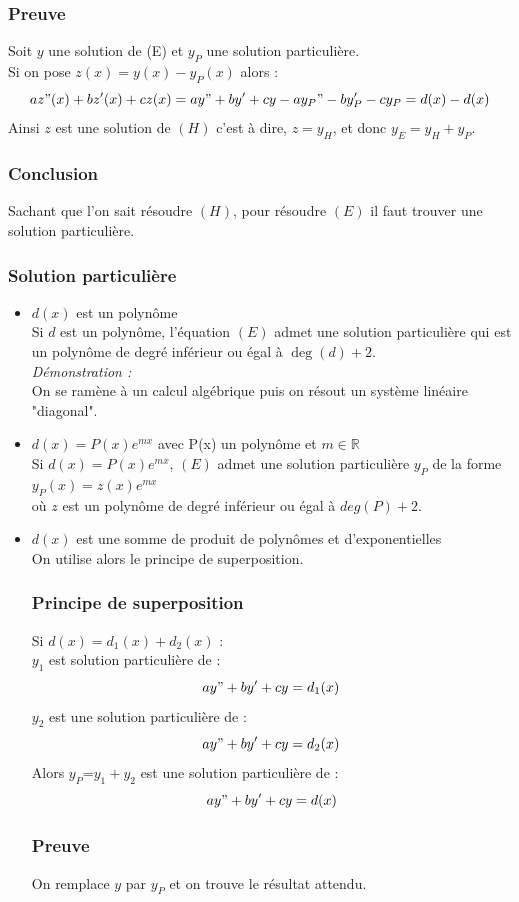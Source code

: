 \documentclass[a4paper,10pt]{book} %
\newcommand{\R}{\mathbb{R}}
\begin{document}
\subsubsection{Preuve}
Soit $y$ une solution de (E) et $y_P$ une solution particulière.\\
Si on pose $z(x)=y(x)-y_P(x)$ alors :
$$az"(x)+bz'(x)+cz(x)=ay"+by'+cy-ay_P"-by_P'-cy_P=d(x)-d(x)$$
Ainsi $z$ est une solution de $(H)$ c'est à dire, $z=y_H$, et donc $y_E=y_H+y_P$.

\subsubsection{Conclusion}
Sachant que l'on sait résoudre $(H)$, pour résoudre $(E)$ il faut trouver une solution particulière.

\subsubsection{Solution particulière}
\begin{itemize}[label=$\bullet$]
\item $d(x)$ est un polynôme\\
Si $d$ est un polynôme, l'équation $(E)$ admet une solution particulière qui est un polynôme de degré inférieur ou égal à $\deg(d)+2$.\\

\textit{Démonstration :}\\
On se ramène à un calcul algébrique puis on résout un système linéaire "diagonal".\\

\item $d(x)=P(x)e^{mx}$ avec P(x) un polynôme et $m\in \R$\\
Si $d(x)=P(x)e^{mx}$, $(E)$ admet une solution particulière $y_P$ de la forme $y_P(x)=z(x)e^{mx}$ \\
où $z$ est un polynôme de degré inférieur ou égal à $deg(P)+2$.\\

\item $d(x)$ est une somme de produit de polynômes et d'exponentielles\\
On utilise alors le principe de superposition.

\subsubsection{Principe de superposition}
Si $d(x)=d_1(x)+d_2(x)$ :\\
$y_1$ est solution particulière de :
$$ay"+by'+cy=d_1(x)$$
$y_2$ est une solution particulière de :
$$ay"+by'+cy=d_2(x)$$
Alors $y_P$=$y_1+y_2$ est une solution particulière de :
$$ay"+by'+cy=d(x)$$

\subsubsection{Preuve}
On remplace $y$ par $y_P$ et on trouve le résultat attendu.

\end{itemize}
\end{document}
